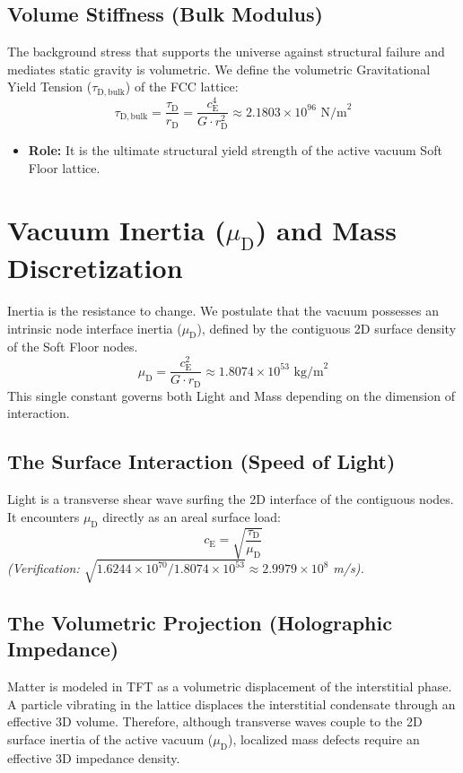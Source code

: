 \subsection{Volume Stiffness (Bulk Modulus)}
The background stress that supports the universe against structural failure and mediates static gravity is volumetric. We define the volumetric Gravitational Yield Tension ($\tau_{\mathrm{D,bulk}}$) of the FCC lattice:
\begin{equation}
    \tau_{\mathrm{D,bulk}} = \frac{\tau_{\mathrm{D}}}{r_{\mathrm{D}}} = \frac{c_{\mathrm{E}}^4}{G \cdot r_{\mathrm{D}}^2} \approx 2.1803 \times 10^{96} \text{ N/m}^2
\end{equation}
\begin{itemize}
    \item \textbf{Role:} It is the ultimate structural yield strength of the active vacuum Soft Floor lattice.
\end{itemize}

\section{Vacuum Inertia ($\mu_{\mathrm{D}}$) and Mass Discretization}
Inertia is the resistance to change. We postulate that the vacuum possesses an intrinsic node interface inertia ($\mu_{\mathrm{D}}$), defined by the contiguous 2D surface density of the Soft Floor nodes.
\begin{equation}
    \mu_{\mathrm{D}} = \frac{c_{\mathrm{E}}^2}{G \cdot r_{\mathrm{D}}} \approx 1.8074 \times 10^{53} \text{ kg/m}^2
\end{equation}
This single constant governs both Light and Mass depending on the dimension of interaction.

\subsection{The Surface Interaction (Speed of Light)}
Light is a transverse shear wave surfing the 2D interface of the contiguous nodes. It encounters $\mu_{\mathrm{D}}$ directly as an areal surface load:
\begin{equation}
    c_{\mathrm{E}} = \sqrt{\frac{\tau_{\mathrm{D}}}{\mu_{\mathrm{D}}}}
\end{equation}
\textit{(Verification: $\sqrt{1.6244 \times 10^{70} / 1.8074 \times 10^{53}} \approx 2.9979 \times 10^8$ m/s).}

\subsection{The Volumetric Projection (Holographic Impedance)}
\label{subsec:volumetric_projection}
Matter is modeled in TFT as a volumetric displacement of the interstitial phase. A particle vibrating in the lattice displaces the interstitial condensate through an effective 3D volume. Therefore, although transverse waves couple to the 2D surface inertia of the active vacuum ($\mu_{\mathrm{D}}$), localized mass defects require an effective 3D impedance density.

